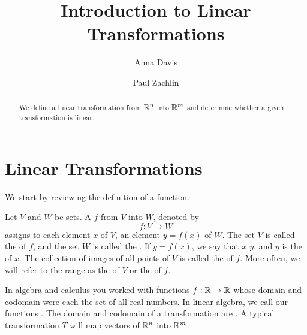 \documentclass{ximera}
\author{Anna Davis \and Paul Zachlin} \title{Introduction to Linear Transformations} \license{CC-BY 4.0}
\begin{document}
\begin{abstract}
  We define a linear transformation from $\mathbb{R}^n$ into $\mathbb{R}^m$ and determine whether a given transformation is linear.
\end{abstract}
\maketitle



\section*{Linear Transformations}
We start by reviewing the definition of a function.

\begin{definition} 
  
Let $V$ and $W$ be sets.  A  $f$ from $V$ into $W$, denoted by 
$$f:V\rightarrow W$$
assigns to each element $x$ of $V$, an element $y=f(x)$ of $W$. 
\vskip 10pt
The set $V$ is called the  of $f$, and the set $W$ is called the .
\vskip 10pt
If $y=f(x)$, we say that $x$  $y$, and $y$ is the  of $x$.
\vskip 10pt
The collection of images of all points of $V$ is called the  of $f$.  More often, we will refer to the range as the  of $V$ or the  of $f$.
  
\end{definition}


In algebra and calculus you worked with functions $f:\mathbb{R}\rightarrow\mathbb{R}$ whose domain and codomain were each the set of all real numbers.  In linear algebra, we call our functions .  The domain and codomain of a transformation are .  A typical transformation $T$ will map vectors of $\mathbb{R}^n$ into $\mathbb{R}^m$.
\end{document}
